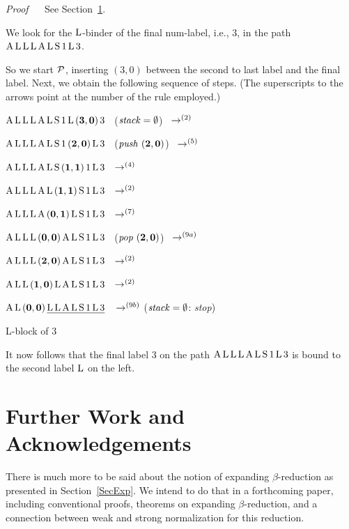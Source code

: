\documentclass[submission,copyright,creativecommons]{eptcs}
\begin{document}
{\em Proof\/} ~~ See Section~\ref{SecFur}.

\begin{Exa}\label{ExaProPat}
We look for the ${\rm L}$-binder of the final num-label, i.e., $3$, in the path ${\rm A \, L \, L \, L \, A \, L \, S \, 1 \, L \, 3} $. 

So we start ${\cal P}$, inserting ${(3,0)}$ between the second to last label and the final label. Next, we obtain the following sequence of steps. (The superscripts to the arrows point at the number of the rule employed.)

\smallskip

${\rm A \, L \, L \, L \, A \, L \, S \, 1 \, L \, {\bf(3,0)} \, 3}$~
(${\it stack} = \emptyset$)~ $\rightarrow^{(2)}$

${\rm A \, L \, L \, L \, A \, L \, S \, 1 \, {\bf(2,0)} \, L \, 3}$~
(${\it push~}  {\bf(2,0)}$)~ $\rightarrow^{(5)}$

${\rm A \,L \, L \, L \, A \, L \, S \, {\bf(1,1)} \, 1 \, L \, 3}$~ $\rightarrow^{(4)}$

${\rm A \, L \, L \, L \, A \, L \, {\bf(1,1)} \, S \, 1 \, L \, 3}$~ $\rightarrow^{(2)}$

${\rm A \, L \, L \, L \, A \, {\bf(0,1)} \, L \, S \, 1 \,  L \, 3}$~ $\rightarrow^{(7)}$

${\rm A \, L \, L \, L \, {\bf(0,0)} \, A \, L \, S \, 1 \,  L \, 3}$~  (${\it pop~} {\bf(2,0)}$)~ $\rightarrow^{(9a)}$

${\rm A \, L \, L \, L \, {\bf(2,0)} \, A \, L \, S \, 1 \,  L \, 3}$~   $\rightarrow^{(2)}$

${\rm A \, L \, L \, {\bf(1,0)} \, L \, A \, L \, S \, 1 \,  L \, 3}$~  $\rightarrow^{(2)}$

${\rm A \, L \, {\bf(0,0)} \, \underline{\rule[-0.1em]{0em}{1em} L \,  L \, A \, L \, S \, 1 \, L \, 3}}$~\,
$\rightarrow^{(9b)}$ (${\it stack} = \emptyset$: {\it stop})

 \hspace{1.5cm} {\rm L}-block of $3$
\end{Exa}

It now follows that the final label 3 on the path ${\rm A \, L \, L \, L \, A \, L \, S \, 1 \, L \, 3} $ is bound to the second label ${\rm L}$ on the left.

\section{Further Work and Acknowledgements}\label{SecFur}

There is much more to be said about the notion of expanding $\beta$-reduction as presented in Section~\ref{SecExp}. We intend to do that in a forthcoming paper, including conventional proofs, theorems on expanding $\beta$-reduction, and a connection between weak and strong normalization for this reduction.
\end{document}
